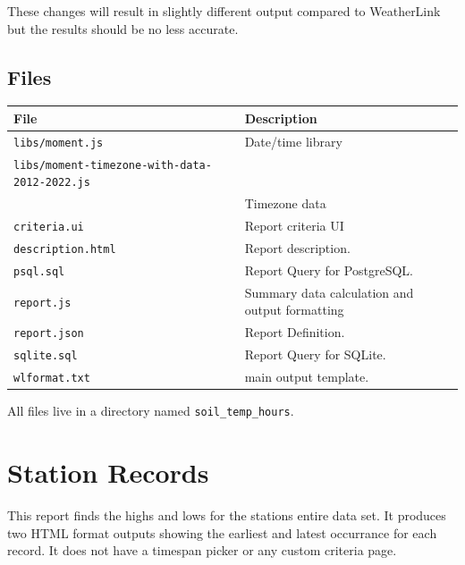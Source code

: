 \documentclass[a4paper,10pt]{book}
\begin{document}
These changes will result in slightly different output compared to WeatherLink but the results should be no less accurate.

\subsection{Files}

\begin{tabular}{p{6cm} l}
\hline
\textbf{File} & \textbf{Description} \\
\hline
\verb|libs/moment.js| & Date/time library\\
\verb|libs/moment-timezone-with-data-2012-2022.js| & \\
& Timezone data \\
\verb|criteria.ui| & Report criteria UI \\
\verb|description.html| & Report description.\\
\verb|psql.sql| & Report Query for PostgreSQL. \\
\verb|report.js| & Summary data calculation and output formatting\\
\verb|report.json| & Report Definition. \\
\verb|sqlite.sql| & Report Query for SQLite. \\
\verb|wlformat.txt| & main output template.\\
\hline
\end{tabular}

All files live in a directory named \verb|soil_temp_hours|.

\section{Station Records}
This report finds the highs and lows for the stations entire data set. It produces two HTML format outputs showing the earliest and latest occurrance for each record. It does not have a timespan picker or any custom criteria page.
\end{document}

